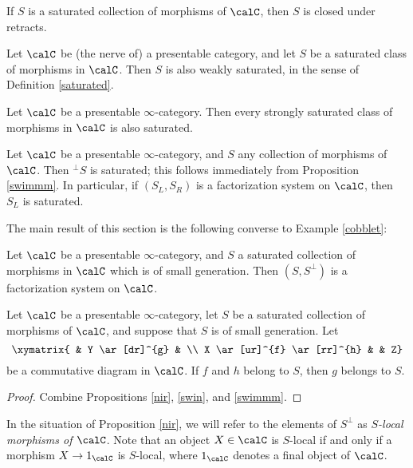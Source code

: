 \begin{remark}
If $S$ is a saturated collection of morphisms of $\calC$, then $S$ is closed under retracts.
\end{remark}

\begin{remark}
Let $\calC$ be (the nerve of) a presentable category, and let $S$ be a saturated class of morphisms
in $\calC$. Then $S$ is also weakly saturated, in the sense of Definition \ref{saturated}.
\end{remark}

\begin{example}
Let $\calC$ be a presentable $\infty$-category. Then every strongly saturated class of morphisms in $\calC$ is also saturated.
\end{example}

\begin{example}\label{cobblet}
Let $\calC$ be a presentable $\infty$-category, and $S$ any collection of morphisms of $\calC$.
Then $^{\perp}S$ is saturated; this follows immediately from Proposition \ref{swimmm}. 
In particular, if $(S_L, S_R)$ is a factorization system on $\calC$, then $S_L$ is saturated.
\end{example}

The main result of this section is the following converse to Example \ref{cobblet}:

\begin{proposition}\label{nir}
Let $\calC$ be a presentable $\infty$-category, and $S$ a saturated collection of morphisms in $\calC$ which is of small generation. Then $(S, S^{\perp})$ is a factorization system on $\calC$.
\end{proposition}

\begin{corollary}\label{wugg}
Let $\calC$ be a presentable $\infty$-category, let $S$ be a saturated collection of morphisms of $\calC$, and suppose that $S$ is of small generation. Let
$$ \xymatrix{ & Y \ar[dr]^{g} & \\
X \ar[ur]^{f} \ar[rr]^{h} & & Z} $$
be a commutative diagram in $\calC$. If $f$ and $h$ belong to $S$, then $g$ belongs to $S$.
\end{corollary}

\begin{proof}
Combine Propositions \ref{nir}, \ref{swin}, and \ref{swimmm}. 
\end{proof}

In the situation of Proposition \ref{nir}, we will refer to the elements of $S^{\perp}$ as {\it $S$-local morphisms of $\calC$}. Note that an object $X \in \calC$ is $S$-local if and only if a
morphism $X \rightarrow 1_{\calC}$ is $S$-local, where $1_{\calC}$ denotes a final object of $\calC$. 

